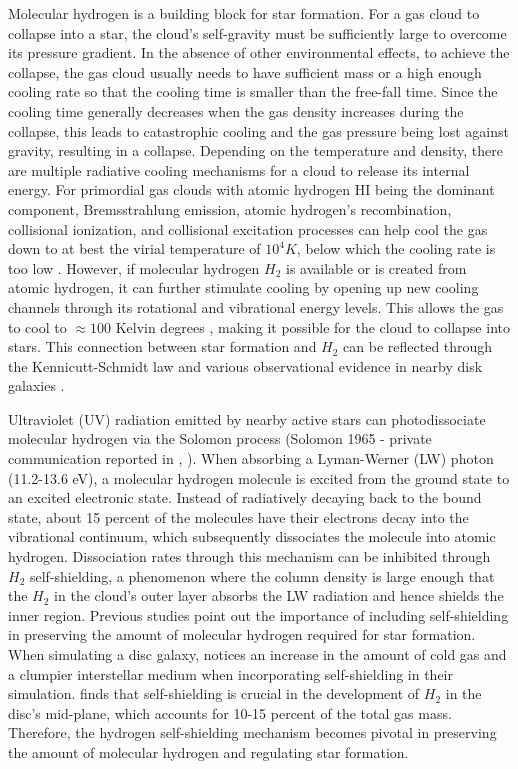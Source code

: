 \documentclass[linenumbers, twocolumn]{aastex631}
\begin{document}
Molecular hydrogen is a building block for star formation. For a gas cloud to collapse into a star, the cloud's self-gravity must be sufficiently large to overcome its pressure gradient. In the absence of other environmental effects, to achieve the collapse, the gas cloud usually needs to have sufficient mass or a high enough cooling rate so that the cooling time is smaller than the free-fall time. Since the cooling time generally decreases when the gas density increases during the collapse, this leads to catastrophic cooling and the gas pressure being lost against gravity, resulting in a collapse. Depending on the temperature and density, there are multiple radiative cooling mechanisms for a cloud to release its internal energy. For primordial gas clouds with atomic hydrogen HI being the dominant component, Bremsstrahlung emission, atomic hydrogen's recombination, collisional ionization, and collisional excitation processes can help cool the gas down to at best the virial temperature of $10^{4} K$, below which the cooling rate is too low \citep{Thoul+1995}. However, if molecular hydrogen $H_{2}$ is available or is created from atomic hydrogen, it can further stimulate cooling by opening up new cooling channels through its rotational and vibrational energy levels. This allows the gas to cool to $\approx 100$ Kelvin degrees \citep{Galli+1998}, making it possible for the cloud to collapse into stars. This connection between star formation and $H_{2}$ can be reflected through the Kennicutt-Schmidt law \citep{Schmidt+1959, Kennicutt+1998} and various observational evidence in nearby disk galaxies \citep{Wong+2002, Kennicutt+2007, Leroy+2013}. 

Ultraviolet (UV) radiation emitted by nearby active stars can photodissociate molecular hydrogen via the Solomon process (Solomon 1965 - private communication reported in \citealt{Field+1966}, \citealt{Stecher+1967}). When absorbing a Lyman-Werner (LW) photon (11.2-13.6 eV), a molecular hydrogen molecule is excited from the ground state to an excited electronic state. Instead of radiatively decaying back to the bound state, about 15 percent of the molecules have their electrons decay into the vibrational continuum, which subsequently dissociates the molecule into atomic hydrogen. Dissociation rates through this mechanism can be inhibited through $H_2$ self-shielding, a phenomenon where the column density is large enough that the $H_{2}$ in the cloud's outer layer absorbs the LW radiation and hence shields the inner region. Previous studies point out the importance of including self-shielding in preserving the amount of molecular hydrogen required for star formation. When simulating a disc galaxy, \citep{Christensen+2012} notices an increase in the amount of cold gas and a clumpier interstellar medium when incorporating self-shielding in their simulation. \cite{Safranek-Shrader+2017} finds that self-shielding is crucial in the development of $H_{2}$ in the disc's mid-plane, which accounts for 10-15 percent of the total gas mass. Therefore, the hydrogen self-shielding mechanism becomes pivotal in preserving the amount of molecular hydrogen and regulating star formation. 
\end{document}
